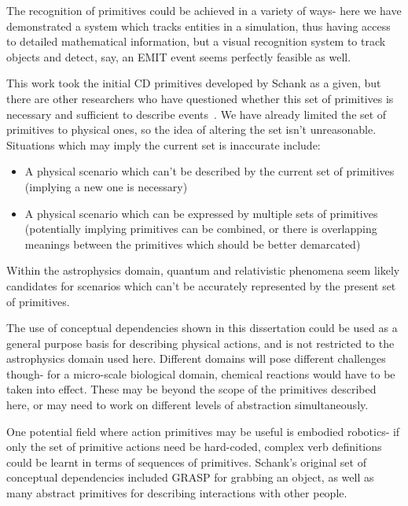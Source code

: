 \documentclass{article}
\begin{document}
    The recognition of primitives could be achieved in a variety of ways- here we have demonstrated a system which tracks entities in a simulation, thus having access to detailed mathematical information, but a visual recognition system to track objects and detect, say, an EMIT event seems perfectly feasible as well.

    This work took the initial CD primitives developed by Schank as a given, but there are other researchers who have questioned whether this set of primitives is necessary and sufficient to describe events~\cite{macbethimage}. We have already limited the set of primitives to physical ones, so the idea of altering the set isn't unreasonable. Situations which may imply the current set is inaccurate include:
    \begin{itemize}
        \item A physical scenario which can't be described by the current set of primitives (implying a new one is necessary)
        \item A physical scenario which can be expressed by multiple sets of primitives (potentially implying primitives can be combined, or there is overlapping meanings between the primitives which should be better demarcated)
    \end{itemize}

    Within the astrophysics domain, quantum and relativistic phenomena seem likely candidates for scenarios which can't be accurately represented by the present set of primitives.

    The use of conceptual dependencies shown in this dissertation could be used as a general purpose basis for describing physical actions, and is not restricted to the astrophysics domain used here. Different domains will pose different challenges though- for a micro-scale biological domain, chemical reactions would have to be taken into effect. These may be beyond the scope of the primitives described here, or may need to work on different levels of abstraction simultaneously.

    One potential field where action primitives may be useful is embodied robotics- if only the set of primitive actions need be hard-coded, complex verb definitions could be learnt in terms of sequences of primitives. Schank's original set of conceptual dependencies included GRASP for grabbing an object, as well as many abstract primitives for describing interactions with other people.
\end{document}
